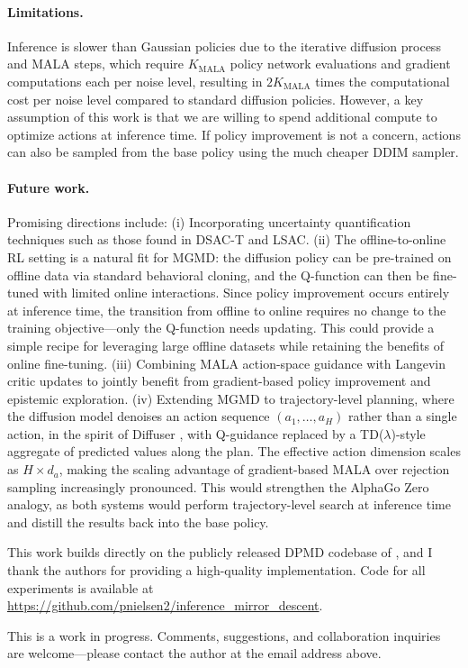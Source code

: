 \documentclass{article}
\theoremstyle{plain}
\theoremstyle{definition}
\theoremstyle{remark}
\begin{document}
\paragraph{Limitations.}
Inference is slower than Gaussian policies due to the iterative diffusion process and MALA steps, which require $K_\text{MALA}$ policy network evaluations and gradient computations each per noise level, resulting in $2K_\text{MALA}$ times the computational cost per noise level compared to standard diffusion policies. However, a key assumption of this work is that we are willing to spend additional compute to optimize actions at inference time. If policy improvement is not a concern, actions can also be sampled from the base policy using the much cheaper DDIM sampler.

\paragraph{Future work.}
Promising directions include:
(i) Incorporating uncertainty quantification techniques such as those found in DSAC-T and LSAC.
(ii) The offline-to-online RL setting is a natural fit for MGMD: the diffusion policy can be pre-trained on offline data via standard behavioral cloning, and the Q-function can then be fine-tuned with limited online interactions. Since policy improvement occurs entirely at inference time, the transition from offline to online requires no change to the training objective---only the Q-function needs updating. This could provide a simple recipe for leveraging large offline datasets while retaining the benefits of online fine-tuning.
(iii) Combining MALA action-space guidance with Langevin critic updates \citep{lsac2025} to jointly benefit from gradient-based policy improvement and epistemic exploration.
(iv) Extending MGMD to trajectory-level planning, where the diffusion model denoises an action sequence $(a_1, \ldots, a_H)$ rather than a single action, in the spirit of Diffuser \citep{janner2022diffuser}, with Q-guidance replaced by a TD($\lambda$)-style aggregate of predicted values along the plan. The effective action dimension scales as $H \times d_a$, making the scaling advantage of gradient-based MALA over rejection sampling increasingly pronounced. This would strengthen the AlphaGo Zero analogy, as both systems would perform trajectory-level search at inference time and distill the results back into the base policy.


\begin{ack}
This work builds directly on the publicly released DPMD codebase of \citet{ma2025soft}, and I thank the authors for providing a high-quality implementation.
Code for all experiments is available at \url{https://github.com/pnielsen2/inference_mirror_descent}.

This is a work in progress.
Comments, suggestions, and collaboration inquiries are welcome---please contact the author at the email address above.
\end{ack}
\end{document}
